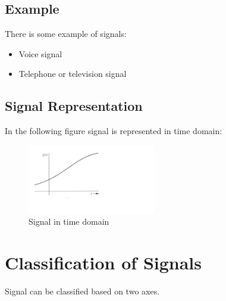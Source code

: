 \documentclass{report}
\begin{document}
\subsection{Example}
There is some example of signals: 

\begin{itemize}
    \item Voice signal
    \item Telephone or television signal
\end{itemize}


\subsection{Signal Representation}

In the following figure signal is represented in time domain:
\begin{figure}[h!]
    \centering
    \includegraphics[width = 0.5\textwidth]{signal.png}
    \caption{Signal in time domain}
    \label{fig:signal}
\end{figure}


\section{Classification of Signals}
Signal can be classified based on two axes.
\end{document}
